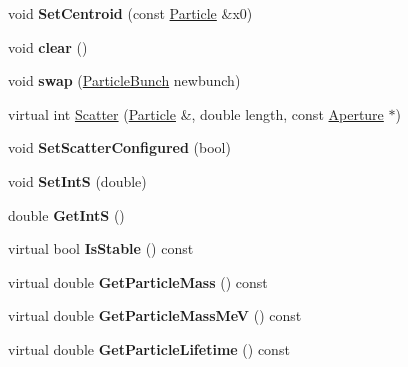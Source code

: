 \begin{DoxyCompactItemize}
\item 
\mbox{\label{classParticleTracking_1_1ParticleBunch_aca82f1eafacf2b73427efa2689ab1231}} 
void {\bfseries Set\+Centroid} (const \hyperlink{classPSvector}{Particle} \&x0)
\item 
\mbox{\label{classParticleTracking_1_1ParticleBunch_a60a6b9714945e1fb11db89cc45be182d}} 
void {\bfseries clear} ()
\item 
\mbox{\label{classParticleTracking_1_1ParticleBunch_af32c38dc3c2faa48df1310881966776a}} 
void {\bfseries swap} (\hyperlink{classParticleTracking_1_1ParticleBunch}{Particle\+Bunch} newbunch)
\item 
virtual int \hyperlink{classParticleTracking_1_1ParticleBunch_aa722546fa53e2299c66aece41ee8c813}{Scatter} (\hyperlink{classPSvector}{Particle} \&, double length, const \hyperlink{classAperture}{Aperture} $\ast$)
\item 
\mbox{\label{classParticleTracking_1_1ParticleBunch_af0a5b035656938c7f029dd0fcfe6cda9}} 
void {\bfseries Set\+Scatter\+Configured} (bool)
\item 
\mbox{\label{classParticleTracking_1_1ParticleBunch_a2bcc701e823ab01d96f4681721ddebb5}} 
void {\bfseries Set\+IntS} (double)
\item 
\mbox{\label{classParticleTracking_1_1ParticleBunch_a51c050dbb3e3a7ca323f87be92a038d1}} 
double {\bfseries Get\+IntS} ()
\item 
\mbox{\label{classParticleTracking_1_1ParticleBunch_a42843c4bc2fe47a1fdc2e50ff14c8673}} 
virtual bool {\bfseries Is\+Stable} () const
\item 
\mbox{\label{classParticleTracking_1_1ParticleBunch_a8a7ff653152eae9d5c0a8ca65f366f04}} 
virtual double {\bfseries Get\+Particle\+Mass} () const
\item 
\mbox{\label{classParticleTracking_1_1ParticleBunch_a5fe96cef7169c939e44747bbdfe5cf71}} 
virtual double {\bfseries Get\+Particle\+Mass\+MeV} () const
\item 
\mbox{\label{classParticleTracking_1_1ParticleBunch_a33e565f3d234d8825e6ff2b3e8150f69}} 
virtual double {\bfseries Get\+Particle\+Lifetime} () const
\end{DoxyCompactItemize}
